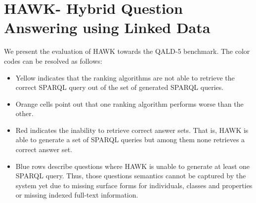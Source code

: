 \chapter{HAWK- Hybrid Question Answering using Linked Data}
\label{cha:app_hawk}


We present the evaluation of HAWK towards the \ac{QALD}-5 benchmark. The color codes can be resolved as follows:
\begin{itemize}
\item Yellow indicates that the ranking algorithms are not able to retrieve the correct SPARQL query out of the set of generated SPARQL queries. 
\item Orange cells point out that one ranking algorithm performs worse than the other. 
\item Red indicates the inability to retrieve correct answer sets.
That is, HAWK is able to generate a set of SPARQL queries but among them none retrieves a correct answer set.
\item Blue rows describe questions where HAWK is unable to generate at least one SPARQL query. Thus, those questions semantics cannot be captured by the system yet due to missing surface forms for individuals, classes and properties or missing indexed full-text information.
\end{itemize}
{
\scriptsize

}

